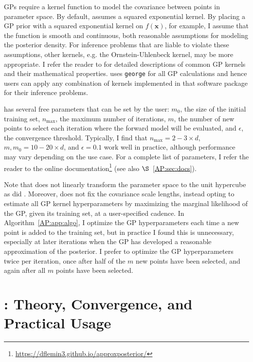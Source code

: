 GPs require a kernel function to model the covariance between points in parameter space. By default, \approxposterior assumes a squared exponential kernel. By placing a GP prior with a squared exponential kernel on $f(\textbf{x})$, for example, I assume that the function is smooth and continuous, both reasonable assumptions for modeling the posterior density. For inference problems that are liable to violate these assumptions, other kernels, e.g. the Ornstein-Uhlenbeck kernel, may be more appropriate. I refer the reader to \citet{Rasmussen2006} for detailed descriptions of common GP kernels and their mathematical properties. \approxposterior uses \texttt{george} \citep{george} for all GP calculations and hence users can apply any combination of kernels implemented in that software package for their inference problems.

\approxposterior has several free parameters that can be set by the user: $m_0$, the size of the initial training set, $n_{\mathrm{max}}$, the maximum number of iterations, $m$, the number of new points to select each iteration where the forward model will be evaluated, and $\epsilon$, the convergence threshold. Typically, I find that $n_{\mathrm{max}}=2-3 \times d$, $m, m_0 = 10-20 \times d$, and $\epsilon = 0.1$ work well in practice, although performance may vary depending on the use case. For a complete list of \approxposterior parameters, I refer the reader to the online documentation\footnote{ \href{https://dflemin3.github.io/approxposterior}{https://dflemin3.github.io/approxposterior/}} (see also $\S$~\ref{AP:sec:docs}).

Note that \approxposterior does not linearly transform the parameter space to the unit hypercube as did \citet{Kandasamy2017}. Moreover, \approxposterior does not fix the covariance scale lengths, instead opting to estimate all GP kernel hyperparameters by maximizing the marginal likelihood of the GP, given its training set, at a user-specified cadence. In Algorithm~\ref{AP:app:algo}, I optimize the GP hyperparameters each time a new point is added to the training set, but in practice I found this is unnecessary, especially at later iterations when the GP has developed a reasonable approximation of the posterior. I prefer to optimize the GP hyperparameters twice per iteration, once after half of the $m$ new points have been selected, and again after all $m$ points have been selected.

\section{\approxposterior: Theory, Convergence, and Practical Usage} \label{ap:sec:usage}

